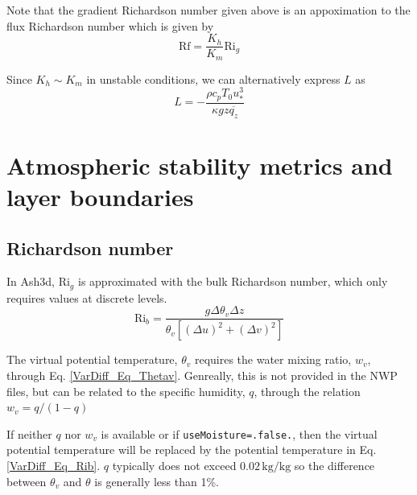 Note that the gradient Richardson number given above is an appoximation to the flux
Richardson number which is given by
\begin{equation}\label{VarDiff_Eq_Rf}
\mathrm{Rf} = \frac{K_h}{K_m}\mathrm{Ri}_g
\end{equation}

Since $K_h \sim K_m$ in unstable conditions, we can alternatively express $L$ as
\begin{equation}
L = -\frac{\rho c_p T_0 u^3_{*}}{\kappa g z \overline{q_z}} %
\end{equation}



\section{Atmospheric stability metrics and layer boundaries}
\subsection{Richardson number}

In Ash3d, $\mathrm{Ri}_g$ is approximated with the bulk Richardson number, which
only requires values at discrete levels.
\begin{equation}\label{VarDiff_Eq_Rib}
\mathrm{Ri}_b = \frac{g \Delta \theta_v \Delta z}
{\theta_v \left[ \left( \Delta u \right)^2 + \left( \Delta v \right)^2 \right]}
\end{equation}

The virtual potential temperature, $\theta_v$ requires the water mixing ratio, $w_v$,
through Eq. \ref{VarDiff_Eq_Thetav}. Genreally, this is not provided
in the NWP files, but can be related to the specific humidity, $q$, through the relation
$w_v=q/(1-q)$

If neither $q$ nor $w_v$ is available or if \texttt{useMoisture=.false.}, then
the virtual potential temperature will be replaced by the potential temperature in Eq. \ref{VarDiff_Eq_Rib}.
$q$ typically does not exceed $0.02 \, \mathrm{kg}/\mathrm{kg}$ so the difference between $\theta_v$
and $\theta$ is generally less than 1\%.

